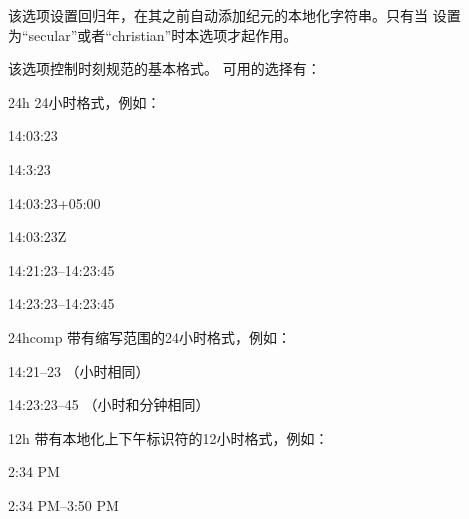 \begin{optionlist}

该选项设置回归年，在其之前自动添加纪元的本地化字符串。只有当  设置为“secular”或者“christian”时本选项才起作用。



该选项控制时刻规范的基本格式。
可用的选择有：

\begin{valuelist}
	\item[24h] %
	24小时格式，例如：\par
	14:03:23\par
	14:3:23\par
	14:03:23+05:00\par
	14:03:23Z\par
	14:21:23--14:23:45\par
	14:23:23--14:23:45\par
	\item[24hcomp] %
	带有缩写范围的24小时格式，例如：\par
	14:21--23 （小时相同）\par %
	14:23:23--45 （小时和分钟相同）\par %
	\item[12h] %
	带有本地化上下午标识符的12小时格式，例如：\par
	2:34 PM\par
	2:34 PM--3:50 PM\par
\end{valuelist}
%

\end{optionlist}
